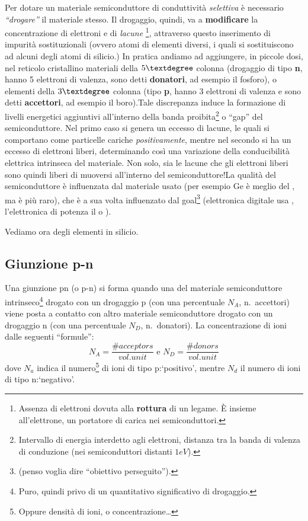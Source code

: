 \documentclass[
]{book}
\begin{document}
Per dotare un materiale semiconduttore di conduttività \emph{selettiva}
è necessario \emph{``drogare''} il materiale stesso. Il drogaggio,
quindi, va a \textbf{modificare} la concentrazione di elettroni e di
\emph{lacune} \footnote{Assenza di elettroni dovuta alla
  \textbf{rottura} di un legame. È insieme all'elettrone, un portatore
  di carica nei semiconduttori.}, attraverso questo inserimento di
impurità sostituzionali (ovvero atomi di elementi diversi, i quali si
sostituiscono ad alcuni degli atomi di silicio.) \newline In pratica
andiamo ad aggiungere, in piccole dosi, nel reticolo cristallino
materiali della \(5\textdegree\) colonna (drogaggio di tipo \textbf{n},
hanno 5 elettroni di valenza, sono detti \textbf{donatori}, ad esempio
il fosforo), o elementi della \(3\textdegree\) colonna (tipo \textbf{p},
hanno 3 elettroni di valenza e sono detti \textbf{accettori}, ad esempio
il boro).\newline Tale discrepanza induce la formazione di livelli
energetici aggiuntivi all'interno della banda proibita\footnote{Intervallo
  di energia interdetto agli elettroni, distanza tra la banda di valenza
  di conduzione (nei semiconduttori distanti \(1\si{eV}\)).} o ``gap''
del semiconduttore. Nel primo caso si genera un eccesso di lacune, le
quali si comportano come particelle cariche \emph{positivamente}, mentre
nel secondo si ha un eccesso di elettroni liberi, determinando così una
variazione della conducibilità elettrica intrinseca del materiale.
\newline Non solo, sia le lacune che gli elettroni liberi sono quindi
liberi di muoversi all'interno del semiconduttore!\newline La qualità
del semiconduttore è influenzata dal materiale usato (per esempio Ge è
meglio del , ma è più raro), che è a sua volta influenzato dal
goal\footnote{(penso voglia dire ``obiettivo perseguito'').}
(elettronica digitale usa , l'elettronica di potenza il 
o ).

Vediamo ora degli elementi in silicio.

\subsection{Giunzione p-n}\label{giunzione-p-n}

Una giunzione pn (o p-n) si forma quando una del materiale
semiconduttore intrinseco\footnote{Puro, quindi privo di un quantitativo
  significativo di drogaggio.} drogato con un drogaggio p (con una
percentuale \(N_{A}\), n.~accettori) viene posta a contatto con altro
materiale semiconduttore drogato con un drogaggio n (con una percentuale
\(N_{D}\), n.~donatori). \newline La concentrazione di ioni dalle
seguenti ``formule'': \[
N_A = \frac{\# acceptors}{vol. unit} \text{ e } N_D=\frac{\# donors}{vol. unit}
\] dove \(N_a\) indica il numero\footnote{Oppure densità di ioni, o
  concentrazione\ldots{}} di ioni di tipo p:`positivo', mentre \(N_d\)
il numero di ioni di tipo n:`negativo'.
\end{document}
